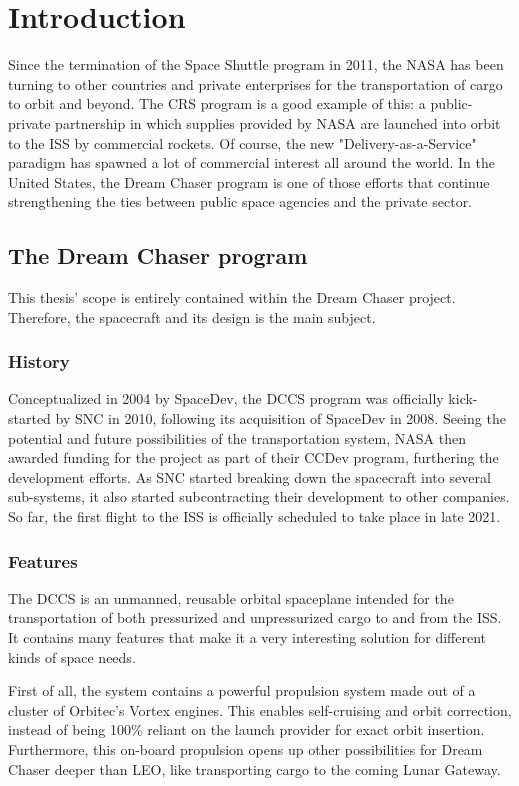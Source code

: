 \setlength{\parindent}{2em}
\chapter{Introduction}\label{cha:intro}
Since the termination of the Space Shuttle program in 2011, the \gls{NASA} has been turning to other countries and private enterprises for the transportation of cargo to orbit and beyond. The \gls{CRS} program is a good example of this: a public-private partnership in which supplies provided by NASA are launched into orbit to the \gls{ISS} by commercial rockets. Of course, the new "Delivery-as-a-Service" paradigm has spawned a lot of commercial interest all around the world. In the United States, the Dream Chaser program is one of those efforts that continue strengthening the ties between public space agencies and the private sector.

\section{The Dream Chaser program}
This thesis' scope is entirely contained within the Dream Chaser project. Therefore, the spacecraft and its design is the main subject. 
\subsection*{History}
Conceptualized in 2004 by SpaceDev, the \gls{DCCS} program was officially kick-started by \gls{SNC} in 2010, following its acquisition of SpaceDev in 2008\cite{online:fikes}. Seeing the potential and future possibilities of the transportation system, NASA then awarded funding for the project as part of their \gls{CCDev} program, furthering the development efforts. As \gls{SNC} started breaking down the spacecraft into several sub-systems, it also started subcontracting their development to other companies. So far, the first flight to the \gls{ISS} is officially scheduled to take place in late 2021\cite{online:kanayama}.

\subsection*{Features}
The \gls{DCCS} is an unmanned, reusable orbital spaceplane intended for the transportation of both pressurized and unpressurized cargo to and from the \gls{ISS}. It contains many features that make it a very interesting solution for different kinds of space needs. 

First of all, the system contains a powerful propulsion system made out of a cluster of Orbitec's Vortex engines\cite{online:messier}. This enables self-cruising and orbit correction, instead of being 100\% reliant on the launch provider for exact orbit insertion. Furthermore, this on-board propulsion opens up other possibilities for Dream Chaser deeper than \gls{LEO}, like transporting cargo to the coming Lunar Gateway\cite{online:foust}.

